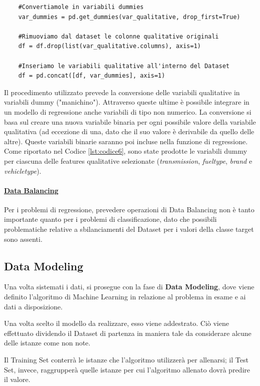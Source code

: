 \begin{itemize}
\begin{lstlisting}
    #Convertiamole in variabili dummies
    var_dummies = pd.get_dummies(var_qualitative, drop_first=True)
    
    #Rimuoviamo dal dataset le colonne qualitative originali
    df = df.drop(list(var_qualitative.columns), axis=1)
    
    #Inseriamo le variabili qualitative all'interno del Dataset
    df = pd.concat([df, var_dummies], axis=1)
    \end{lstlisting}
    Il procedimento utilizzato prevede la conversione delle variabili qualitative in variabili dummy ("manichino"). Attraverso queste ultime è possibile integrare in un modello di regressione anche variabili di tipo non numerico. La conversione si basa sul creare una nuova variabile binaria per ogni possibile valore della variabile qualitativa (ad eccezione di una, dato che il suo valore è derivabile da quello delle altre). Queste variabili binarie saranno poi incluse nella funzione di regressione. Come riportato nel Codice \ref{lst:codice6}, sono state prodotte le variabili dummy per ciascuna delle features qualitative selezionate (\textit{transmission}, \textit{fuel\textunderscore type}, \textit{brand} e \textit{vehicle\textunderscore type}).
    
\end{itemize}

\paragraph{\textcolor[HTML]{000099}{\underline{Data Balancing}}}
Per i problemi di regressione, prevedere operazioni di Data Balancing non è tanto importante quanto per i problemi di classificazione, dato che possibili problematiche relative a sbilanciamenti del Dataset per i valori della classe target sono assenti.
\pagebreak
\subsection{Data Modeling}
Una volta sistemati i dati, si prosegue con la fase di \textbf{Data Modeling}, dove viene definito l'algoritmo di Machine Learning in relazione al problema in esame e ai dati a disposizione.

Una volta scelto il modello da realizzare, esso viene addestrato. Ciò viene effettuato dividendo il Dataset di partenza in maniera tale da considerare alcune delle istanze come non note.

Il Training Set conterrà le istanze che l'algoritmo utilizzerà per allenarsi; il Test Set, invece, raggrupperà quelle istanze per cui l'algoritmo allenato dovrà predire il valore.


